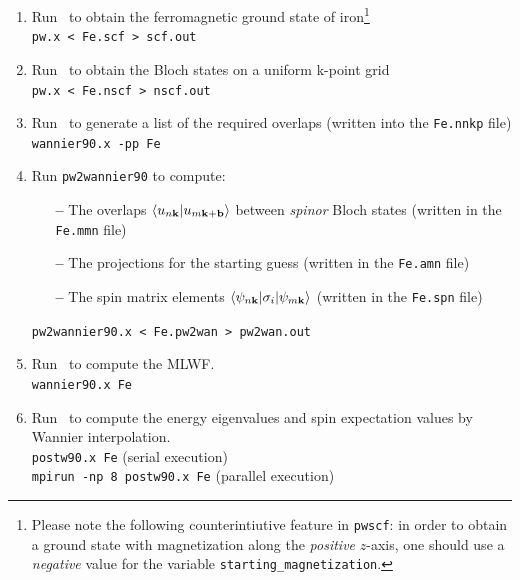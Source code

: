 \documentclass[a4paper,11pt,twoside]{article}
\begin{document}
\begin{enumerate}
\item Run \pwscf\ to obtain the ferromagnetic ground state of
  iron\footnote{Please note the following counterintiutive feature in
    {\tt pwscf}: in order to obtain a ground state with magnetization
    along the {\it positive} $z$-axis, one should use a {\it negative}
    value for the variable {\tt starting\_magnetization}.}\\
  {\tt pw.x < Fe.scf > scf.out}

\item Run \pwscf\ to obtain the Bloch states on a uniform k-point
  grid\\ 
{\tt pw.x < Fe.nscf > nscf.out}

\item Run \wannier\ to generate a list of the required overlaps (written
  into the {\tt Fe.nnkp} file)\\
{\tt wannier90.x -pp Fe}

\item Run {\tt pw2wannier90} to compute:
  \begin{itemize}

  \item[{\bf --}] The overlaps $\langle u_{n{\bf k}}\vert u_{m{\bf
        k}+{\bf b}}\rangle$ between {\it spinor} Bloch states (written
    in the {\tt Fe.mmn} file)

  \item[{\bf --}] The projections for the starting guess (written in
    the {\tt Fe.amn} file)

  \item[{\bf --}] The spin matrix elements $\langle \psi_{n{\bf
        k}}\vert \sigma_i\vert \psi_{m{\bf k}}\rangle$ (written in the
    {\tt Fe.spn} file)
  \end{itemize}
{\tt pw2wannier90.x < Fe.pw2wan > pw2wan.out}

\item Run \wannier\ to compute the MLWF.\\
{\tt wannier90.x Fe}

\item Run \postw\ to compute the energy eigenvalues and spin
  expectation values
  by Wannier interpolation.\\
  {\tt postw90.x Fe} (serial execution)\\
  {\tt mpirun -np 8 postw90.x Fe} (parallel execution)

\end{enumerate}
\end{document}
